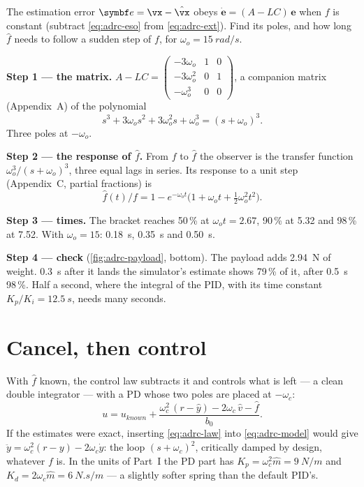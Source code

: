 \begin{example}
\label{ex:adrc-eso}
The estimation error $\symbf e = \vx - \hat{\vx}$ obeys $\dot{\symbf e} = (A - LC)\,\symbf e$ when $f$ is constant (subtract \cref{eq:adrc-eso} from \cref{eq:adrc-ext}). Find its poles, and how long $\hat f$ needs to follow a sudden step of $f$, for $\omega_o = \SI{15}{rad/s}$.

\textbf{Step 1 — the matrix.} $A - LC = \begin{pmatrix} -3\omega_o & 1 & 0\\ -3\omega_o^2 & 0 & 1\\ -\omega_o^3 & 0 & 0\end{pmatrix}$, a companion matrix (Appendix~A) of the polynomial
\begin{equation*}
  s^3 + 3\omega_os^2 + 3\omega_o^2s + \omega_o^3 = (s + \omega_o)^3 .
\end{equation*}
Three poles at $-\omega_o$.

\textbf{Step 2 — the response of $\hat f$.} From $f$ to $\hat f$ the observer is the transfer function $\omega_o^3/(s + \omega_o)^3$, three equal lags in series. Its response to a unit step (Appendix~C, partial fractions) is
\begin{equation*}
  \hat f(t)/f = 1 - e^{-\omega_ot}\big(1 + \omega_ot + \tfrac12\omega_o^2t^2\big) .
\end{equation*}

\textbf{Step 3 — times.} The bracket reaches 50\,\% at $\omega_ot = 2.67$, 90\,\% at 5.32 and 98\,\% at 7.52. With $\omega_o = 15$: \SI{0.18}{s}, \SI{0.35}{s} and \SI{0.50}{s}.

\textbf{Step 4 — check} (\cref{fig:adrc-payload}, bottom). The payload adds \SI{2.94}{N} of weight. \SI{0.3}{s} after it lands the simulator's estimate shows 79\,\% of it, after \SI{0.5}{s} 98\,\%. Half a second, where the integral of the PID, with its time constant $K_p/K_i = \SI{12.5}{s}$, needs many seconds.
\end{example}

\section{Cancel, then control}

With $\hat f$ known, the control law subtracts it and controls what is left — a clean double integrator — with a PD whose two poles are placed at $-\omega_c$:
\begin{equation}\label{eq:adrc-law}
  u = u_{known} + \frac{\omega_c^2\,(r - \hat y) - 2\omega_c\,\hat v - \hat f}{b_0} .
\end{equation}
If the estimates were exact, inserting \cref{eq:adrc-law} into \cref{eq:adrc-model} would give $\ddot y = \omega_c^2(r - y) - 2\omega_c\dot y$: the loop $(s + \omega_c)^2$, critically damped by design, whatever $f$ is. In the units of Part~I the PD part has $K_p = \omega_c^2\hat m = \SI{9}{N/m}$ and $K_d = 2\omega_c\hat m = \SI{6}{N.s/m}$ — a slightly softer spring than the default PID's.

